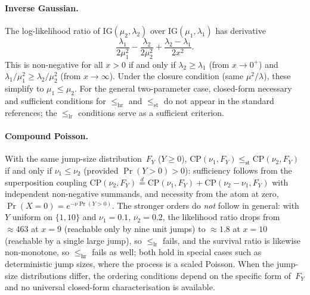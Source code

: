 \documentclass[11pt,a4paper]{article}
\theoremstyle{plain}
\theoremstyle{definition}
\theoremstyle{remark}
\begin{document}
\paragraph{Inverse Gaussian.}
The log-likelihood ratio of $\mathrm{IG}(\mu_2,\lambda_2)$ over $\mathrm{IG}(\mu_1,\lambda_1)$ has derivative
\[
  \frac{\lambda_1}{2\mu_1^2} - \frac{\lambda_2}{2\mu_2^2} + \frac{\lambda_2 - \lambda_1}{2x^2}.
\]
This is non-negative for all $x > 0$ if and only if $\lambda_2 \ge \lambda_1$ (from $x \to 0^+$) and $\lambda_1/\mu_1^2 \ge \lambda_2/\mu_2^2$ (from $x \to \infty$).
Under the closure condition (same $\mu^2/\lambda$), these simplify to $\mu_1 \le \mu_2$.
For the general two-parameter case, closed-form necessary and sufficient conditions for $\le_{\mathrm{hr}}$ and $\le_{\mathrm{st}}$ do not appear in the standard references; the $\le_{\mathrm{lr}}$ conditions serve as a sufficient criterion.

\paragraph{Compound Poisson.}
With the same jump-size distribution~$F_Y$ ($Y \ge 0$), $\mathrm{CP}(\nu_1, F_Y) \le_{\mathrm{st}} \mathrm{CP}(\nu_2, F_Y)$ if and only if $\nu_1 \le \nu_2$ (provided $\Pr(Y>0) > 0$): sufficiency follows from the superposition coupling $\mathrm{CP}(\nu_2, F_Y) \stackrel{d}{=} \mathrm{CP}(\nu_1, F_Y) + \mathrm{CP}(\nu_2 - \nu_1, F_Y)$ with independent non-negative summands, and necessity from the atom at zero, $\Pr(X = 0) = e^{-\nu \Pr(Y > 0)}$.
The stronger orders do \emph{not} follow in general: with $Y$ uniform on $\{1, 10\}$ and $\nu_1 = 0.1$, $\nu_2 = 0.2$, the likelihood ratio drops from ${\approx}463$ at $x = 9$ (reachable only by nine unit jumps) to ${\approx}1.8$ at $x = 10$ (reachable by a single large jump), so $\le_{\mathrm{lr}}$ fails, and the survival ratio is likewise non-monotone, so $\le_{\mathrm{hr}}$ fails as well; both hold in special cases such as deterministic jump sizes, where the process is a scaled Poisson.
When the jump-size distributions differ, the ordering conditions depend on the specific form of~$F_Y$ and no universal closed-form characterisation is available.
\end{document}
